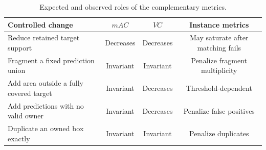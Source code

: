 \begin{table}[t]
\centering
\caption{Expected and observed roles of the complementary metrics.}
\label{tab:metric_property_matrix}
\begin{tabular}{lccc}
\hline
Controlled change & $mAC$ & $VC$ & Instance metrics \\
\hline
Reduce retained target support & Decreases & Decreases & May saturate after matching fails \\
Fragment a fixed prediction union & Invariant & Invariant & Penalize fragment multiplicity \\
Add area outside a fully covered target & Invariant & Decreases & Threshold-dependent \\
Add predictions with no valid owner & Invariant & Decreases & Penalize false positives \\
Duplicate an owned box exactly & Invariant & Invariant & Penalize duplicates \\
\hline
\end{tabular}
\end{table}
